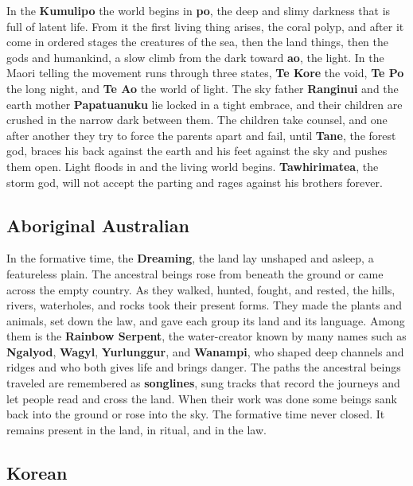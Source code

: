 In the \textbf{Kumulipo} the world begins in \textbf{po}, the deep and slimy darkness that is full of latent life. From it the first living thing arises, the coral polyp, and after it come in ordered stages the creatures of the sea, then the land things, then the gods and humankind, a slow climb from the dark toward \textbf{ao}, the light. In the Maori telling the movement runs through three states, \textbf{Te Kore} the void, \textbf{Te Po} the long night, and \textbf{Te Ao} the world of light. The sky father \textbf{Ranginui} and the earth mother \textbf{Papatuanuku} lie locked in a tight embrace, and their children are crushed in the narrow dark between them. The children take counsel, and one after another they try to force the parents apart and fail, until \textbf{Tane}, the forest god, braces his back against the earth and his feet against the sky and pushes them open. Light floods in and the living world begins. \textbf{Tawhirimatea}, the storm god, will not accept the parting and rages against his brothers forever.

\subsection{Aboriginal Australian}

In the formative time, the \textbf{Dreaming}, the land lay unshaped and asleep, a featureless plain. The ancestral beings rose from beneath the ground or came across the empty country. As they walked, hunted, fought, and rested, the hills, rivers, waterholes, and rocks took their present forms. They made the plants and animals, set down the law, and gave each group its land and its language. Among them is the \textbf{Rainbow Serpent}, the water-creator known by many names such as \textbf{Ngalyod}, \textbf{Wagyl}, \textbf{Yurlunggur}, and \textbf{Wanampi}, who shaped deep channels and ridges and who both gives life and brings danger. The paths the ancestral beings traveled are remembered as \textbf{songlines}, sung tracks that record the journeys and let people read and cross the land. When their work was done some beings sank back into the ground or rose into the sky. The formative time never closed. It remains present in the land, in ritual, and in the law.

\subsection{Korean}

